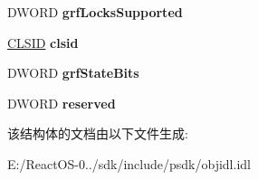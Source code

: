 \begin{DoxyCompactItemize}
\item 
\mbox{\label{struct_i_stream_1_1tag_s_t_a_t_s_t_g_a9b19d84bf195426d3c4ed41b93485001}} 
D\+W\+O\+RD {\bfseries grf\+Locks\+Supported}
\item 
\mbox{\label{struct_i_stream_1_1tag_s_t_a_t_s_t_g_a35ae885bc139da374720421db9b3c8f8}} 
\hyperlink{struct___i_i_d}{C\+L\+S\+ID} {\bfseries clsid}
\item 
\mbox{\label{struct_i_stream_1_1tag_s_t_a_t_s_t_g_a13b8e885c24d88487f28b56aad4245da}} 
D\+W\+O\+RD {\bfseries grf\+State\+Bits}
\item 
\mbox{\label{struct_i_stream_1_1tag_s_t_a_t_s_t_g_a813fc840328e10f143fd7e17230c09f8}} 
D\+W\+O\+RD {\bfseries reserved}
\end{DoxyCompactItemize}


该结构体的文档由以下文件生成\+:\begin{DoxyCompactItemize}
\item 
E\+:/\+React\+O\+S-\/0../sdk/include/psdk/objidl.\+idl\end{DoxyCompactItemize}
